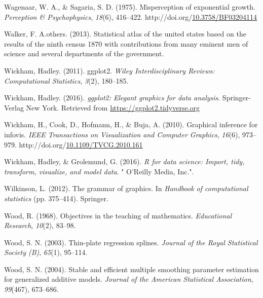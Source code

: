 \documentclass[print]{nuthesis}
\newlength{\cslhangindent}
\newenvironment{CSLReferences}%
{\setlength{\parindent}{0pt}%
\everypar{\setlength{\hangindent}{\cslhangindent}}\ignorespaces}%
{\par}
\begin{document}
\begin{CSLReferences}{1}{0}
\leavevmode{}%
Wagenaar, W. A., \& Sagaria, S. D. (1975). Misperception of exponential growth. \emph{Perception \& Psychophysics}, \emph{18}(6), 416--422. http://doi.org/\href{https://doi.org/10.3758/BF03204114}{10.3758/BF03204114}

\leavevmode{}%
Walker, F. A.others. (2013). Statistical atlas of the united states based on the results of the ninth census 1870 with contributions from many eminent men of science and several departments of the government.

\leavevmode{}%
Wickham, Hadley. (2011). ggplot2. \emph{Wiley Interdisciplinary Reviews: Computational Statistics}, \emph{3}(2), 180--185.

\leavevmode{}%
Wickham, Hadley. (2016). \emph{ggplot2: Elegant graphics for data analysis}. Springer-Verlag New York. Retrieved from \url{https://ggplot2.tidyverse.org}

\leavevmode{}%
Wickham, H., Cook, D., Hofmann, H., \& Buja, A. (2010). Graphical inference for infovis. \emph{IEEE Transactions on Visualization and Computer Graphics}, \emph{16}(6), 973--979. http://doi.org/\href{https://doi.org/10.1109/TVCG.2010.161}{10.1109/TVCG.2010.161}

\leavevmode{}%
Wickham, Hadley, \& Grolemund, G. (2016). \emph{R for data science: Import, tidy, transform, visualize, and model data}. " O'Reilly Media, Inc.".

\leavevmode{}%
Wilkinson, L. (2012). The grammar of graphics. In \emph{Handbook of computational statistics} (pp. 375--414). Springer.

\leavevmode{}%
Wood, R. (1968). Objectives in the teaching of mathematics. \emph{Educational Research}, \emph{10}(2), 83--98.

\leavevmode{}%
Wood, S. N. (2003). Thin-plate regression splines. \emph{Journal of the Royal Statistical Society (B)}, \emph{65}(1), 95--114.

\leavevmode{}%
Wood, S. N. (2004). Stable and efficient multiple smoothing parameter estimation for generalized additive models. \emph{Journal of the American Statistical Association}, \emph{99}(467), 673--686.


\end{CSLReferences}
\end{document}
